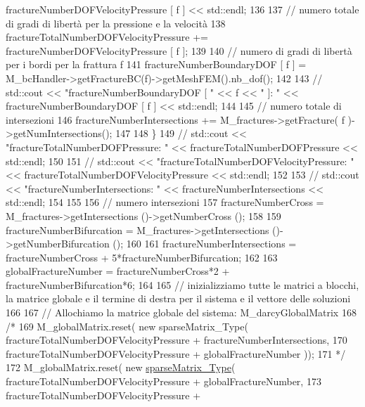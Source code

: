 \begin{DoxyCode}
{       fractureNumberDOFVelocityPressure [ f ] << std::endl;}
136 
137         \textcolor{comment}{// numero totale di gradi di libertà per la pressione e la velocità}
138         fractureTotalNumberDOFVelocityPressure += fractureNumberDOFVelocityPressure [ f ];
139 
140         \textcolor{comment}{// numero di gradi di libertà per i bordi per la frattura f}
141         fractureNumberBoundaryDOF [ f ] = M\_bcHandler->getFractureBC(f)->getMeshFEM().nb\_dof();
142         
143    \textcolor{comment}{//     std::cout << "fractureNumberBoundaryDOF [ " << f << " ]:  " << fractureNumberBoundaryDOF [ f ] <<
       std::endl;}
144 
145         \textcolor{comment}{// numero totale di intersezioni}
146         fractureNumberIntersections += M\_fractures->getFracture( f )->getNumIntersections();
147 
148     \}
149     \textcolor{comment}{//  std::cout << "fractureTotalNumberDOFPressure:  " << fractureTotalNumberDOFPressure << std::endl;}
150       
151     \textcolor{comment}{//  std::cout << "fractureTotalNumberDOFVelocityPressure:  " << fractureTotalNumberDOFVelocityPressure
       << std::endl;}
152 
153     \textcolor{comment}{//  std::cout << "fractureNumberIntersections:  " << fractureNumberIntersections << std::endl;}
154     
155 
156     \textcolor{comment}{// numero intersezioni}
157     fractureNumberCross = M\_fractures->getIntersections ()->getNumberCross ();
158    
159     fractureNumberBifurcation = M\_fractures->getIntersections ()->getNumberBifurcation ();
160     
161     fractureNumberIntersections = fractureNumberCross + 5*fractureNumberBifurcation;
162     
163     globalFractureNumber = fractureNumberCross*2 + fractureNumberBifurcation*6;
164         
165     \textcolor{comment}{// inizializziamo tutte le matrici a blocchi, la matrice globale e il termine di destra per il sistema
       e il vettore delle soluzioni }
166     
167     \textcolor{comment}{// Allochiamo la matrice globale del sistema:  M\_darcyGlobalMatrix}
168   \textcolor{comment}{/*}
169 \textcolor{comment}{    M\_globalMatrix.reset( new sparseMatrix\_Type( fractureTotalNumberDOFVelocityPressure +
       fractureNumberIntersections,}
170 \textcolor{comment}{                                                 fractureTotalNumberDOFVelocityPressure +
       globalFractureNumber ));}
171 \textcolor{comment}{    */}
172     M\_globalMatrix.reset( \textcolor{keyword}{new} \hyperlink{Core_8h_afba9f623673e2ae32054015bdb5500f9}{sparseMatrix\_Type}( fractureTotalNumberDOFVelocityPressure + 
      globalFractureNumber,
173                                                  fractureTotalNumberDOFVelocityPressure + 

\end{DoxyCode}
